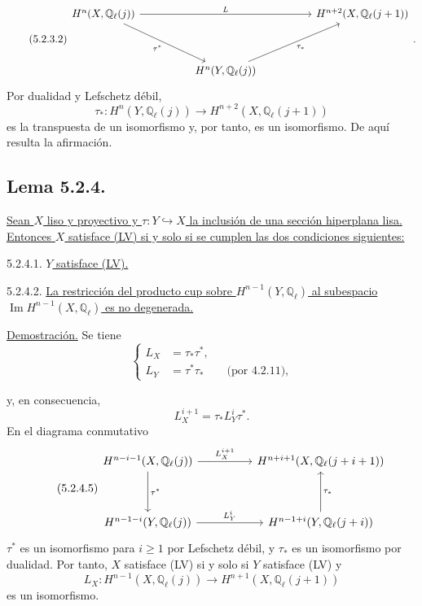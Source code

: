 \pageoriginale

\begin{equation}\tag{5.2.3.2}
\begin{tikzcd}[column sep=huge,row sep=huge]
H^n(X,\mathbb Q_\ell(j))
  \arrow[rr,"L"]\arrow[dr,"\tau^*"']
  & {} &
H^{n+2}(X,\mathbb Q_\ell(j+1))
  \sisi{\arrow[dl,"\tau_*"]}{}\\
{} & H^n(Y,\mathbb Q_\ell(j))\sisi{}{\arrow[ur,"\tau_*"']} & {}
\end{tikzcd}.
\end{equation}
Por dualidad y Lefschetz débil,
\[
\tau_*:H^n(Y,\mathbb Q_\ell(j))
\longrightarrow H^{n+2}(X,\mathbb Q_\ell(j+1))
\]
es la transpuesta de un isomorfismo y, por tanto, es un isomorfismo.
De aquí resulta la afirmación.

\subsection*{Lema 5.2.4.}
\underline{Sean $X$ liso y proyectivo y
$\tau:Y\hookrightarrow X$ la inclusión de una sección hiperplana lisa.
Entonces $X$ satisface (LV) si y solo si se cumplen las dos condiciones
siguientes:}

\smallskip
\noindent
\textup{5.2.4.1.} \underline{$Y$ satisface (LV).}

\smallskip
\noindent
\textup{5.2.4.2.} \underline{La restricción del producto cup sobre
$H^{n-1}(Y,\mathbb Q_\ell)$ al subespacio
$\operatorname{Im}H^{n-1}(X,\mathbb Q_\ell)$ es no degenerada.}

\noindent\underline{Demostración.}
Se tiene
\begin{equation}\tag{5.2.4.3}
\left\{
\begin{aligned}
L_X&=\tau_*\tau^*,\\[1ex]
L_Y&=\tau^*\tau_* \qquad\text{(por 4.2.11),}
\end{aligned}
\right.
\end{equation}

\pageoriginale

y, en consecuencia,
\begin{equation}\tag{5.2.4.4}
L_X^{i+1}=\tau_*L_Y^i\tau^*.
\end{equation}
En el diagrama conmutativo
\begin{equation}\tag{5.2.4.5}
\begin{tikzcd}[column sep=huge,row sep=huge]
H^{n-i-1}(X,\mathbb Q_\ell(j))
  \arrow[r,"L_X^{i+1}"]\arrow[d,"\tau^*"]
  &H^{n+i+1}(X,\mathbb Q_\ell(j+i+1))\\
H^{n-1-i}(Y,\mathbb Q_\ell(j))
  \arrow[r,"L_Y^i"]
  &H^{n-1+i}(Y,\mathbb Q_\ell(j+i))\arrow[u,"\tau_*"']
\end{tikzcd}
\end{equation}
$\tau^*$ es un isomorfismo para $i\geq1$ por Lefschetz débil, y
$\tau_*$ es un isomorfismo por dualidad. Por tanto, $X$ satisface
(LV) si y solo si $Y$ satisface (LV) y
\begin{equation}\tag{5.2.4.6}
L_X:H^{n-1}(X,\mathbb Q_\ell(j))
\longrightarrow H^{n+1}(X,\mathbb Q_\ell(j+1))
\end{equation}
es un isomorfismo.

